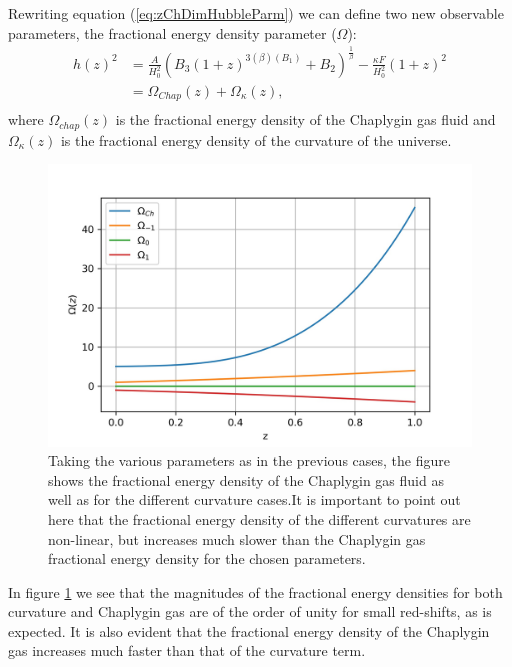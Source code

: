 \documentclass[a4paper, 11pt]{FSKH_623_Report}
\numberwithin{equation}{section}
\newcommand{\brac}[1]{\left(#1\right)}
\begin{document}
Rewriting equation (\ref{eq:zChDimHubbleParm}) we can define two new observable parameters, the fractional energy density parameter ($\Omega$):
\begin{equation}\label{eq:ChFracEnDen}
\begin{split}
h(z)^{2} &= \frac{A}{H_{0}^{2}}\brac{B_{3}\brac{1+z}^{3\brac{\beta}\brac{B_{1}}}+B_{2}}^{\frac{1}{\beta}} -\frac{\kappa F}{H_{0}^{2}}\brac{1+z}^{2}\\
&= \Omega_{Chap}(z)+\Omega_{\kappa}(z),\\
\end{split}
\end{equation}
where $\Omega_{chap}(z)$ is the fractional energy density of the Chaplygin gas fluid and $\Omega_{\kappa}(z)$ is the fractional energy density of the curvature of the universe.
\begin{figure}[H]
\centering
\includegraphics[scale=0.9]{Figures/ch_Om.jpg}
\caption{Taking the various parameters as in the previous cases, the figure shows the fractional energy density of the Chaplygin gas fluid as well as for the different curvature cases.It is important to point out here that the fractional energy density of the different curvatures are non-linear, but increases much slower than the Chaplygin gas fractional energy density for the chosen parameters.}
\label{fig:ChFracEnDen}
\end{figure}
In figure \ref{fig:ChFracEnDen} we see that the magnitudes of the fractional energy densities for both curvature and Chaplygin gas are of the order of unity for small red-shifts, as is expected. It is also evident that the fractional energy density of the Chaplygin gas increases much faster than that of the curvature term.
\end{document}

